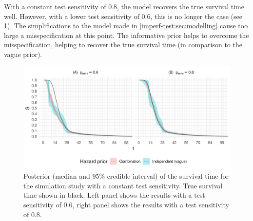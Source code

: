 \documentclass[thesis.tex]{subfiles}
\begin{document}
With a constant test sensitivity of 0.8, the model recovers the true survival time well.
However, with a lower test sensitivity of 0.6, this is no longer the case (see \cref{imperf-test:fig:constant-test-sensitivity}).
The simplifications to the model made in \cref{imperf-test:sec:modelling} cause too large a misspecification at this point.
The informative prior helps to overcome the misspecification, helping to recover the true survival time (in comparison to the vague prior).
\begin{figure}
  \includegraphics[width=\textwidth]{cis-imperfect-testing/sim-constant-sensitivity}
  \caption[Simulation study results with constant test sensitivity]{%
    Posterior (median and 95\% credible interval) of the survival time for the simulation study with a constant test sensitivity.
    True survival time shown in black.
    Left panel shows the results with a test sensitivity of 0.6, right panel shows the results with a test sensitivity of 0.8.
  }
  \label{imperf-test:fig:constant-test-sensitivity}
\end{figure}
\end{document}
